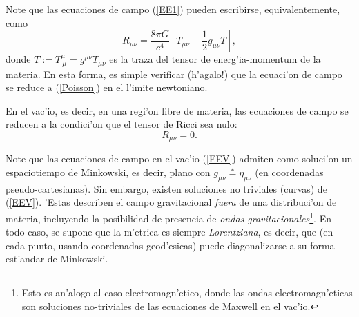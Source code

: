 Note que las ecuaciones de campo (\ref{EE1}) pueden escribirse, equivalentemente, como
\begin{equation}\label{EE3}
 R_{\mu\nu}=\frac{8\pi G}{c^4}\left[ T_{\mu\nu}-\frac{1}{2}g_{\mu\nu}T\right],
\end{equation}
donde $T:=T^\mu_{\ \mu}=g^{\mu\nu}T_{\mu\nu}$ es la traza del tensor de
energ'ia-momentum de la materia. En esta forma, es simple verificar (h'agalo!) que la ecuaci'on de campo se reduce a (\ref{Poisson}) en el l'imite newtoniano.

En el vac'io, es decir, en una regi'on libre de materia, las ecuaciones de
campo se reducen a la condici'on que el tensor de Ricci sea nulo:
\begin{equation}
 R_{\mu\nu}=0. \label{EEV}
\end{equation}

Note que las ecuaciones de campo en el vac'io (\ref{EEV}) admiten como
soluci'on un espaciotiempo de Minkowski, es decir, plano con
$g_{\mu\nu}\stackrel{*}{=}\eta_{\mu\nu}$ (en coordenadas pseudo-cartesianas). Sin embargo, existen soluciones no triviales (curvas) de (\ref{EEV}). 'Estas describen el campo
gravitacional \textit{fuera} de una distribuci'on de materia, incluyendo la posibilidad
de presencia de \textit{ondas gravitacionales}\footnote{Esto es an'alogo al
caso electromagn'etico, donde las ondas electromagn'eticas son soluciones
no-triviales de las ecuaciones de Maxwell en el vac'io.}. En todo caso, se
supone que la m'etrica es siempre \textit{Lorentziana}, es decir, que (en cada
punto, usando coordenadas geod'esicas) puede diagonalizarse a su forma est'andar
de Minkowski.

